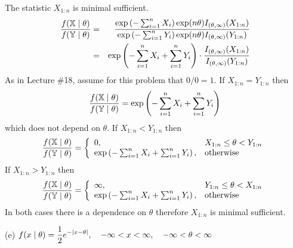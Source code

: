 \documentclass[12pt]{article}
\begin{document}
\bigskip
\noindent
The statistic $X_{1:n}$ is minimal sufficient.
\begin{eqnarray*}
{f(\mathbb X\mid\theta)\over f(\mathbb Y\mid\theta)}
&=&{
\exp\left(-\sum_{i=1}^nX_i\right)
\exp(n\theta)I_{(\theta,\infty)}(X_{1:n})
\over
\exp\left(-\sum_{i=1}^nY_i\right)
\exp(n\theta)I_{(\theta,\infty)}(Y_{1:n})
}\\
&=&\exp\left(-\sum_{i=1}^nX_i+\sum_{i=1}^nY_i\right)
\cdot
{I_{(\theta,\infty)}(X_{1:n})\over I_{(\theta,\infty)}(Y_{1:n})}
\end{eqnarray*}
As in Lecture \#18, assume for this problem that $0/0=1$.
If $X_{1:n}=Y_{1:n}$ then
$${f(\mathbb X\mid\theta)\over f(\mathbb Y\mid\theta)}
=\exp\left(-\sum_{i=1}^nX_i+\sum_{i=1}^nY_i\right)$$
which does not depend on $\theta$.
%
%
%
If $X_{1:n}<Y_{1:n}$ then
$${f(\mathbb X\mid\theta)\over f(\mathbb Y\mid\theta)}
=\left\{
\begin{array}{ll}
0, & X_{1:n}\le\theta<Y_{1:n}\\
\exp\left(-\sum_{i=1}^nX_i+\sum_{i=1}^nY_i\right), & {\rm otherwise}
\end{array}\right.
$$
%
%
%
If $X_{1:n}>Y_{1:n}$ then
$${f(\mathbb X\mid\theta)\over f(\mathbb Y\mid\theta)}
=\left\{
\begin{array}{ll}
\infty, & Y_{1:n}\le\theta<X_{1:n}\\
\exp\left(-\sum_{i=1}^nX_i+\sum_{i=1}^nY_i\right), & {\rm otherwise}
\end{array}\right.
$$
In both cases there is a dependence on $\theta$ therefore
$X_{1:n}$ is minimal sufficient.

\bigskip
\noindent
(e) $\displaystyle{f(x\mid\theta)=
{1\over2}e^{-|x-\theta|},\quad
-\infty<x<\infty,\quad
-\infty<\theta<\infty}$
\end{document}
